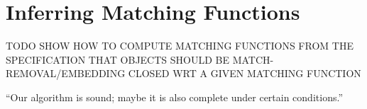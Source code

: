 \section{Inferring Matching Functions}
\label{sec:matching}

TODO SHOW HOW TO COMPUTE MATCHING FUNCTIONS FROM THE SPECIFICATION THAT OBJECTS
SHOULD BE MATCH-REMOVAL/EMBEDDING CLOSED WRT A GIVEN MATCHING FUNCTION

\begin{theorem}
  “Our algorithm is sound; maybe it is also complete under certain conditions.”
\end{theorem}
